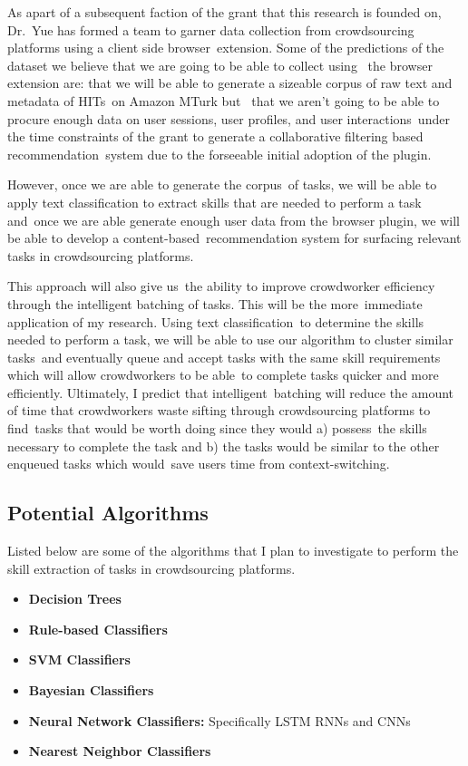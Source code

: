 \documentclass[letterpaper,12pt]{article}
\begin{document}
As apart of a subsequent faction of the grant that this research is founded on, Dr.\
Yue has formed a team to garner data collection from crowdsourcing platforms using a client side browser\
extension. Some of the predictions of the dataset we believe that we are going to be able to collect using \
the browser extension are: that we will be able to generate a sizeable corpus of raw text and metadata of HITs\
on Amazon MTurk but \
that we aren't going to be able to procure enough data on user sessions, user profiles, and user interactions\
under the time constraints of the grant to generate a collaborative filtering based recommendation\
system due to the forseeable initial adoption of the plugin. 

However, once we are able to generate the corpus\
of tasks, we will be able to apply text classification to extract skills that are needed to perform a task and\
once we are able generate enough user data from the browser plugin, we will be able to develop a content-based\
recommendation system for surfacing relevant tasks in crowdsourcing platforms. 

This approach will also give us\
the ability to improve crowdworker efficiency through the intelligent batching of tasks. This will be the more\
immediate application of my research. Using text classification\
to determine the skills needed to perform a task, we will be able to use our algorithm to cluster similar tasks\
and eventually queue and accept tasks with the same skill requirements which will allow crowdworkers to be able\
to complete tasks quicker and more efficiently. Ultimately, I predict that intelligent\
batching will reduce the amount of time that crowdworkers waste sifting through crowdsourcing platforms to find\
tasks that would be worth doing since they would a) possess\
the skills necessary to complete the task and b) the tasks would be similar to the other enqueued tasks which would\
save users time from context-switching.
\subsection{Potential Algorithms}
Listed below are some of the algorithms that I plan to investigate to perform the skill extraction of tasks in
crowdsourcing platforms.
\begin{itemize}
	\item \textbf{Decision Trees}
	\item \textbf{Rule-based Classifiers}
	\item \textbf{SVM Classifiers}
	\item \textbf{Bayesian Classifiers}
	\item \textbf{Neural Network Classifiers:} Specifically LSTM RNNs and CNNs
	\item \textbf{Nearest Neighbor Classifiers}
\end{itemize}
\end{document}
